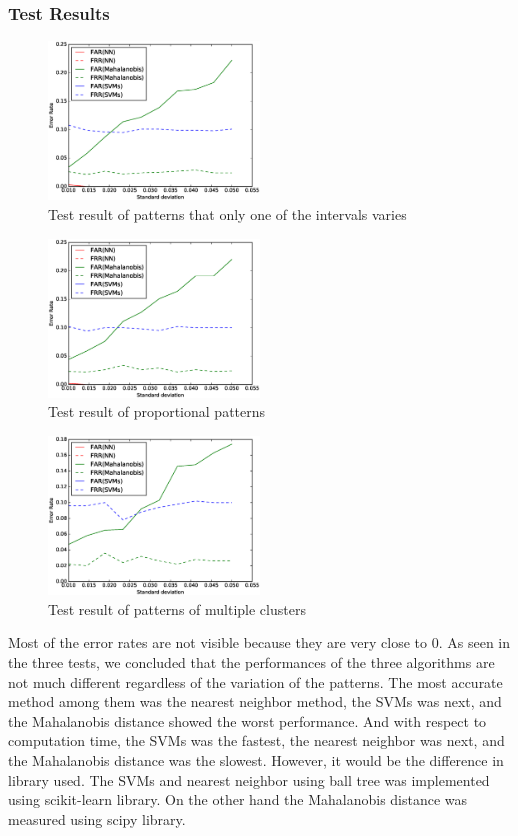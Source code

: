 \documentclass[twocolumn,showpacs,%
  nofootinbib,aps,%
  eqsecnum,prd,notitlepage,showkeys,10pt]{revtex4-1}
\begin{document}
\subsubsection{Test Results}
\begin{figure}[ht]
  \centering
  \includegraphics[width=0.5\textwidth]{one}
  \caption{Test result of patterns that only one of the intervals varies}
  \label{fig:one}
\end{figure}
\begin{figure}[ht]
  \centering
  \includegraphics[width=0.5\textwidth]{prop}
  \caption{Test result of proportional patterns}
  \label{fig:prop}
\end{figure}
\begin{figure}[ht]
  \centering
  \includegraphics[width=0.5\textwidth]{multi}
  \caption{Test result of patterns of multiple clusters}
  \label{fig:multi}
\end{figure}

Most of the error rates are not visible because they are very close to 0. As seen in the three tests, we concluded that the performances of the three algorithms are not much different regardless of the variation of the patterns. The most accurate method among them was the nearest neighbor method, the SVMs was next, and the Mahalanobis distance showed the worst performance. And with respect to computation time, the SVMs was the fastest, the nearest neighbor was next, and the Mahalanobis distance was the slowest. However, it would be the difference in library used. The SVMs and nearest neighbor using ball tree was implemented using scikit-learn library. On the other hand the Mahalanobis distance was measured using scipy library.
\end{document}
